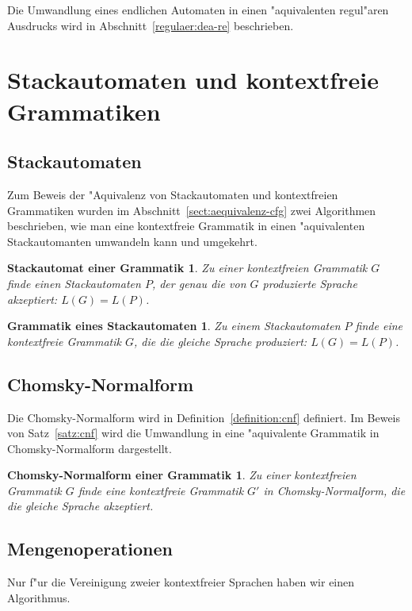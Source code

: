 Die Umwandlung eines endlichen Automaten in einen "aquivalenten
regul"aren Ausdrucks 
wird in Abschnitt~\ref{regulaer:dea-re} beschrieben.

\section{Stackautomaten und kontextfreie Grammatiken}

\subsection{Stackautomaten}
Zum Beweis der "Aquivalenz von Stackautomaten und kontextfreien Grammatiken
wurden im Abschnitt~\ref{sect:aequivalenz-cfg} zwei Algorithmen beschrieben,
wie man eine kontextfreie Grammatik in einen "aquivalenten Stackautomanten
umwandeln kann und umgekehrt.

\newtheorem*{CfgPDA}{Stackautomat einer Grammatik}
\begin{CfgPDA}
Zu einer kontextfreien Grammatik $G$ finde einen Stackautomaten $P$, 
der genau die von $G$ produzierte Sprache akzeptiert: $L(G)=L(P)$.
\end{CfgPDA}

\newtheorem*{PdaCfg}{Grammatik eines Stackautomaten}
\begin{PdaCfg}
Zu einem Stackautomaten $P$ finde eine kontextfreie Grammatik $G$, die
die gleiche Sprache produziert: $L(G)=L(P)$.
\end{PdaCfg}

\subsection{Chomsky-Normalform}
Die Chomsky-Normalform wird in Definition~\ref{definition:cnf} definiert.
Im Beweis von Satz~\ref{satz:cnf} wird die Umwandlung in eine "aquivalente
Grammatik in Chomsky-Normalform dargestellt.

\newtheorem*{CNF}{Chomsky-Normalform einer Grammatik}
\begin{CNF}
Zu einer kontextfreien Grammatik $G$ finde eine kontextfreie Grammatik $G'$
in Chomsky-Normalform, die die gleiche Sprache akzeptiert.
\end{CNF}

\subsection{Mengenoperationen}
Nur f"ur die Vereinigung zweier kontextfreier Sprachen haben wir einen
Algorithmus.

